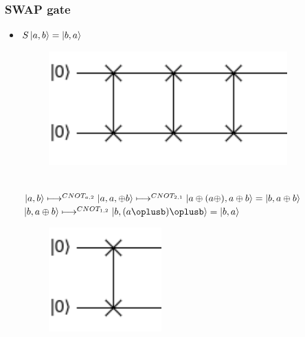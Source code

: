 \documentclass[11.5pt, paper=a4]{article}
\theoremstyle{definition}
\numberwithin{theorem}{section}
\begin{document}
\subsubsection{SWAP gate}
\begin{itemize}
    \item $S\ket{a,b} = \ket{b,a}$ \\
        \begin{figure}[h]
            \centering
            \includegraphics[scale=0.2]{SWAP 3.png}
        \end{figure}\\
        $\ket{a,b} \longmapsto^{CNOT_{a,2}} \ket{a, a,\oplus b} \longmapsto^{CNOT_{2,1}} \ket{a\oplus(a\oplus), a \oplus b} = \ket{b, a \oplus b}$ \\
        $ \ket{b, a \oplus b} \longmapsto^{CNOT_{1,2}} \ket{b, (a\oplusb)\oplusb} = \ket{b, a}$ \\
         \begin{figure}[h]
            \centering
            \includegraphics[scale=0.2]{SWAP 1.png}
        \end{figure}\\
\end{itemize}
\end{document}
